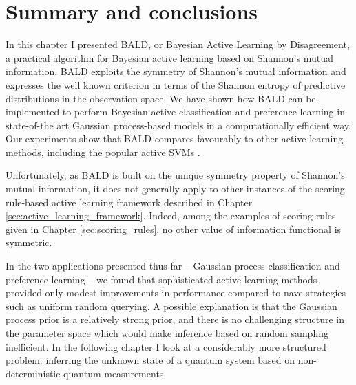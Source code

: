 \section{Summary and conclusions}

In this chapter I presented BALD, or Bayesian Active Learning by Disagreement, a practical algorithm for Bayesian active learning based on Shannon's mutual information. BALD exploits the symmetry of Shannon's mutual information and expresses the well known criterion in terms of the Shannon entropy of predictive distributions in the observation space. We have shown how BALD can be implemented to perform Bayesian active classification and preference learning in state-of-the art Gaussian process-based models in a computationally efficient way. Our experiments show that BALD compares favourably to other active learning methods, including the popular active SVMs \citep{Tong2002}.

Unfortunately, as BALD is built on the unique symmetry property of Shannon's mutual information, it does not generally apply to other instances of the scoring rule-based active learning framework described in Chapter \ref{sec:active_learning_framework}. Indeed, among the examples of scoring rules given in Chapter \ref{sec:scoring_rules}, no other value of information functional is symmetric.

\cbstart
In the two applications presented thus far -- Gaussian process classification and preference learning -- we found that sophisticated active learning methods provided only modest improvements in performance compared to nave strategies such as uniform random querying. A possible explanation is that the Gaussian process prior is a relatively strong prior, and there is no challenging structure in the parameter space which would make inference based on random sampling inefficient. In the following chapter I look at a considerably more structured problem: inferring the unknown state of a quantum system based on non-deterministic quantum measurements.
\cbend
